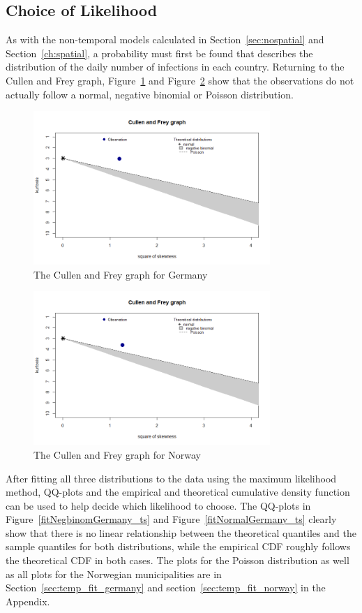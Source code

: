\subsection{Choice of Likelihood}
As with the non-temporal models calculated in Section~\ref{sec:nospatial} and Section~\ref{ch:spatial}, a probability must first be found that describes the distribution of the daily number of infections in each country. Returning to the Cullen and Frey graph, Figure~\ref{cf_germany_ts} and Figure~\ref{cf_norway_ts} show that the observations do not actually follow a normal, negative binomial or Poisson distribution.
\begin{figure}[H]
  \centering
  \includegraphics[width = 0.8\textwidth]{cf_germany_ts.png}
  \caption{The Cullen and Frey graph for Germany}
  \label{cf_germany_ts}
\end{figure}
\begin{figure}[H]
  \centering
  \includegraphics[width = 0.8\textwidth]{cf_norway_ts.png}
  \caption{The Cullen and Frey graph for Norway}
  \label{cf_norway_ts}
\end{figure}
After fitting all three distributions to the data using the maximum likelihood method, QQ-plots and the empirical and theoretical cumulative density function can be used to help decide which likelihood to choose. The QQ-plots in Figure~\ref{fitNegbinomGermany_ts} and Figure~\ref{fitNormalGermany_ts} clearly show that there is no linear relationship between the theoretical quantiles and the sample quantiles for both distributions, while the empirical CDF roughly follows the theoretical CDF in both cases. The plots for the Poisson distribution as well as all plots for the Norwegian municipalities are in Section~\ref{sec:temp_fit_germany} and section~\ref{sec:temp_fit_norway} in the Appendix.
